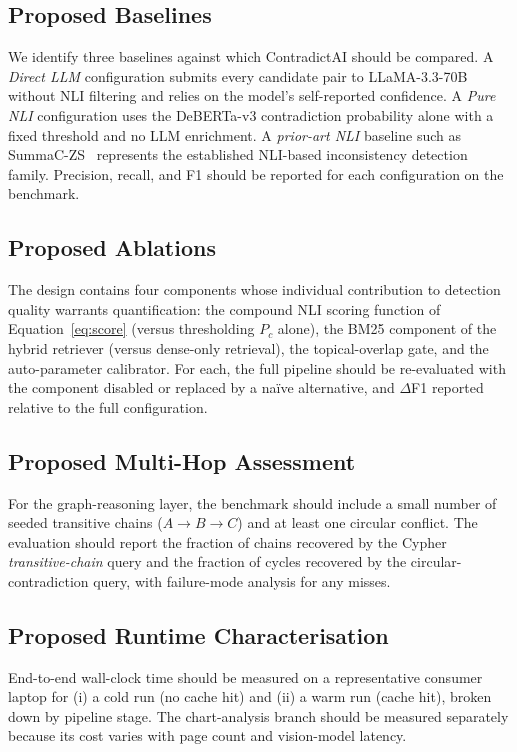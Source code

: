 \documentclass[conference]{IEEEtran}
\begin{document}
\subsection{Proposed Baselines}
We identify three baselines against which ContradictAI should be compared. A \emph{Direct LLM} configuration submits every candidate pair to LLaMA-3.3-70B without NLI filtering and relies on the model's self-reported confidence. A \emph{Pure NLI} configuration uses the DeBERTa-v3 contradiction probability alone with a fixed threshold and no LLM enrichment. A \emph{prior-art NLI} baseline such as SummaC-ZS~\cite{b1} represents the established NLI-based inconsistency detection family. Precision, recall, and F1 should be reported for each configuration on the benchmark.
\subsection{Proposed Ablations}
The design contains four components whose individual contribution to detection quality warrants quantification: the compound NLI scoring function of Equation~\ref{eq:score} (versus thresholding $P_c$ alone), the BM25 component of the hybrid retriever (versus dense-only retrieval), the topical-overlap gate, and the auto-parameter calibrator. For each, the full pipeline should be re-evaluated with the component disabled or replaced by a na\"{i}ve alternative, and $\Delta$F1 reported relative to the full configuration.
\subsection{Proposed Multi-Hop Assessment}
For the graph-reasoning layer, the benchmark should include a small number of seeded transitive chains ($A \rightarrow B \rightarrow C$) and at least one circular conflict. The evaluation should report the fraction of chains recovered by the Cypher \emph{transitive-chain} query and the fraction of cycles recovered by the circular-contradiction query, with failure-mode analysis for any misses.
\subsection{Proposed Runtime Characterisation}
End-to-end wall-clock time should be measured on a representative consumer laptop for (i) a cold run (no cache hit) and (ii) a warm run (cache hit), broken down by pipeline stage. The chart-analysis branch should be measured separately because its cost varies with page count and vision-model latency.
\end{document}
